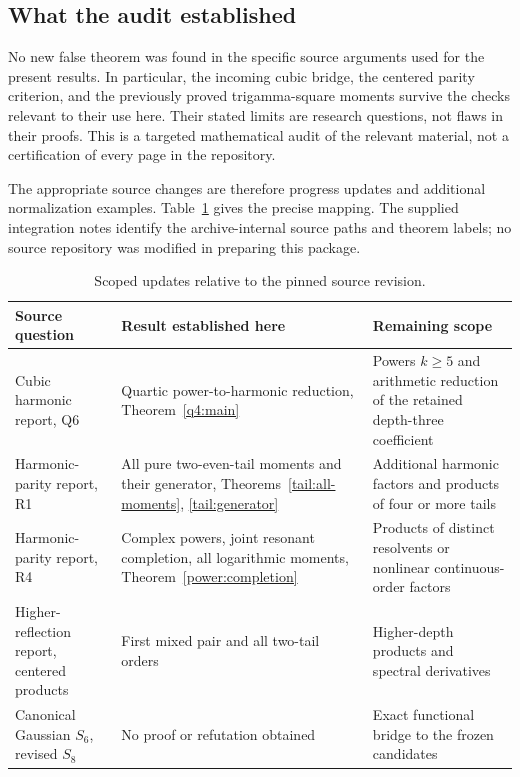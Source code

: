 \documentclass[11pt,a4paper]{article}
\numberwithin{equation}{section}
\theoremstyle{definition}
\theoremstyle{remark}
\begin{document}
\subsection{What the audit established}

No new false theorem was found in the specific source arguments used
for the present results. In particular, the incoming cubic bridge,
the centered parity criterion, and the previously proved
trigamma-square moments survive the checks relevant to their use
here. Their stated limits are research questions, not flaws in
their proofs. This is a targeted mathematical audit of the relevant
material, not a certification of every page in the repository.

The appropriate source changes are therefore progress updates and
additional normalization examples. Table~\ref{audit:status-table}
gives the precise mapping. The supplied integration notes identify
the archive-internal source paths and theorem labels; no source
repository was modified in preparing this package.

\begin{table}[htbp]
\centering\small
\begin{tabular}{@{}>{\raggedright\arraybackslash}p{.28\linewidth}>{\raggedright\arraybackslash}p{.36\linewidth}>{\raggedright\arraybackslash}p{.28\linewidth}@{}}
\toprule
Source question & Result established here & Remaining scope\\
\midrule
Cubic harmonic report, Q6 & Quartic power-to-harmonic reduction,
Theorem~\ref{q4:main} & Powers $k\ge5$ and arithmetic reduction of
the retained depth-three coefficient\\[5pt]
Harmonic-parity report, R1 & All pure two-even-tail moments and their
generator, Theorems~\ref{tail:all-moments}, \ref{tail:generator}
& Additional harmonic factors and products of four or more tails\\[5pt]
Harmonic-parity report, R4 & Complex powers, joint resonant completion,
all logarithmic moments, Theorem~\ref{power:completion}
& Products of distinct resolvents or nonlinear continuous-order factors\\[5pt]
Higher-reflection report, centered products & First mixed pair and all
two-tail orders & Higher-depth products and spectral derivatives\\[5pt]
Canonical Gaussian $S_6$, revised $S_8$ & No proof or refutation obtained
& Exact functional bridge to the frozen candidates\\
\bottomrule
\end{tabular}
\caption{Scoped updates relative to the pinned source revision.}
\label{audit:status-table}
\end{table}
\end{document}
